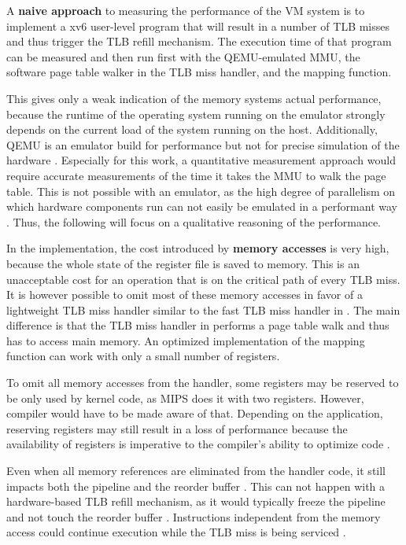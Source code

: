 A \textbf{naive approach} to measuring the performance of the VM system is to implement a xv6 user-level program that will result in a number of TLB misses and thus trigger the TLB refill mechanism. The execution time of that program can be measured and then run first with the QEMU-emulated MMU, the software page table walker in the TLB miss handler, and the mapping function.

This gives only a weak indication of the memory systems actual performance, because the runtime of the operating system running on the emulator strongly depends on the current load of the system running on the host. Additionally, QEMU is an emulator build for performance but not for precise simulation of the hardware \cite{bellard2005qemu}. Especially for this work, a quantitative measurement approach would require accurate measurements of the time it takes the MMU to walk the page table. This is not possible with an emulator, as the high degree of parallelism on which hardware components run can not easily be emulated in a performant way \cite{chen2010emulator}. Thus, the following will focus on a qualitative reasoning of the performance.

In the implementation, the cost introduced by \textbf{memory accesses} is very high, because the whole state of the register file is saved to memory. This is an unacceptable cost for an operation that is on the critical path of every TLB miss. It is however possible to omit most of these memory accesses in favor of a lightweight TLB miss handler similar to the fast TLB miss handler in \cite{heiserAnatomyHighPerformanceMicrokernel}. The main difference is that the TLB miss handler in \cite{heiserAnatomyHighPerformanceMicrokernel} performs a page table walk and thus has to access main memory. An optimized implementation of the mapping function can work with only a small number of registers.

To omit all memory accesses from the handler, some registers may be reserved to be only used by kernel code, as MIPS does it with two registers. However, compiler would have to be made aware of that. Depending on the application, reserving registers may still result in a loss of performance because the availability of registers is imperative to the compiler's ability to optimize code \cite{elphinstone2013l3}.

Even when all memory references are eliminated from the handler code, it still impacts both the pipeline and the reorder buffer \cite{jacobSoftwaremanagedAddressTranslation1997}. This can not happen with a hardware-based TLB refill mechanism, as it would typically freeze the pipeline and not touch the reorder buffer \cite{bhattacharjee2017architectural}. Instructions independent from the memory access could continue execution while the TLB miss is being serviced \cite{jacob1998virtualissues}.


